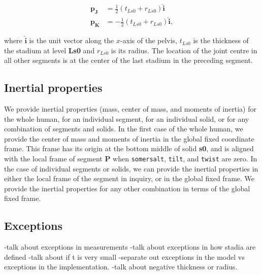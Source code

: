 \documentclass[10pt]{article}
\begin{document}
\begin{align}
    \mathbf{p_J} &= \frac{1}{2} (t_{Ls0} + r_{Ls0})\mathbf{\hat{i}} \\
    \mathbf{p_K} &= -\frac{1}{2} (t_{Ls0} + r_{Ls0})\mathbf{\hat{i}},
\end{align}

where $\mathbf{\hat{i}}$ is the unit vector along the $x$-axis of the pelvis,
$t_{Ls0}$ is the thickness of the stadium at level \textbf{Ls0} and $r_{Ls0}$
is its radius. The location of the joint centre in all other segments is at
the center of the last stadium in the preceding segment.

\subsection*{Inertial properties}

We provide inertial properties (mass, center of mass, and moments of inertia)
for the whole human, for an individual segment, for an individual solid, or for
any combination of segments and solids. In the first case of the whole human,
 we provide the center of mass and moments of inertia in the global fixed coordinate frame. This frame has its
 origin at the bottom middle of solid \textbf{s0}, and is aligned with the
 local frame of segment \textbf{P} when \verb+somersalt+, \verb+tilt+, and
 \verb+twist+ are zero.
 In the case of individual segments or solids, we can provide the inertial
 properties in either the local frame of the segment in inquiry, or in the
 global fixed frame. We provide the inertial properties for any other
 combination in terms of the global fixed frame.







\subsection*{Exceptions}

-talk about exceptions in measurements
-talk about exceptions in how stadia are defined
-talk about if t is very small
-separate out exceptions in the model vs exceptions in the implementation.
-talk about negative thickness or radius.
\end{document}
